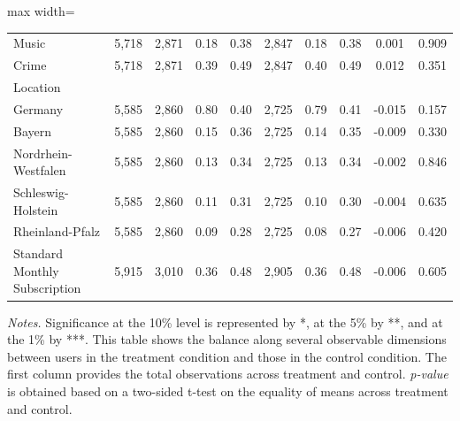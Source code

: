 \begin{table}[H]
\begin{adjustbox}{max width=\textwidth}
\begin{tabular}{lccccccccc}
\hspace{2mm} Music &    5,718 &    2,871 &  0.18 &  0.38 &    2,847 &  0.18 &  0.38 & 0.001 & 0.909 \\
\hspace{2mm} Crime &    5,718 &    2,871 &  0.39 &  0.49 &    2,847 &  0.40 &  0.49 & 0.012 & 0.351 \\
Location & & & & & & & & & \\
\hspace{2mm} Germany &    5,585 &    2,860 &  0.80 &  0.40 &    2,725 &  0.79 &  0.41 & -0.015 & 0.157 \\
\hspace{2mm} Bayern &    5,585 &    2,860 &  0.15 &  0.36 &    2,725 &  0.14 &  0.35 & -0.009 & 0.330 \\
\hspace{2mm} Nordrhein-Westfalen &    5,585 &    2,860 &  0.13 &  0.34 &    2,725 &  0.13 &  0.34 & -0.002 & 0.846 \\
\hspace{2mm} Schleswig-Holstein &    5,585 &    2,860 &  0.11 &  0.31 &    2,725 &  0.10 &  0.30 & -0.004 & 0.635 \\
\hspace{2mm} Rheinland-Pfalz &    5,585 &    2,860 &  0.09 &  0.28 &    2,725 &  0.08 &  0.27 & -0.006 & 0.420 \\
Standard Monthly Subscription &    5,915 &    3,010 &  0.36 &  0.48 &    2,905 &  0.36 &  0.48 & -0.006 & 0.605 \\
 \bottomrule
\end{tabular}
\end{adjustbox}
 \par
 \begin{minipage}{\linewidth}
 \baselineskip9pt {\scriptsize \vspace{0.1cm} {\it Notes.} Significance at the 10\% level is represented by *, at the 5\% by **, and at the 1\% by ***. This table shows the balance along several observable dimensions between users in the treatment condition and those in the control condition. The first column provides the total observations across treatment and control. {\it p-value} is obtained based on a two-sided t-test on the equality of means across treatment and control.}
 \end{minipage}
\end{table}
